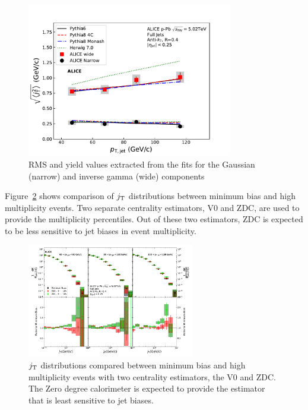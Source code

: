 \begin{figure}[htb]
\begin{center}
\includegraphics[width=0.8\textwidth]{figures/results/RMSWithSystematics_Pythia.pdf}
\caption{RMS and yield values extracted from the fits for the Gaussian (narrow) and inverse gamma (wide) components}
\label{fig:rms_models}
\end{center}
\end{figure}

Figure~\ref{fig:jt_highmult} shows comparison of $j_{\rm T}$ distributions between minimum bias and high multiplicity events. Two separate centrality estimators, V0 and ZDC, are used to provide the multiplicity percentiles. Out of these two estimators, ZDC is expected to be less sensitive to jet biases in event multiplicity.

\begin{figure}[htb]
\begin{center}
\includegraphics[width=0.65\textwidth]{figures/results/HighMJetConeJtSignalPtFrom4To8.pdf}
\caption{$j_{\rm T}$ distributions compared between minimum bias and high multiplicity events with two centrality estimators, the V0 and ZDC. The Zero degree calorimeter is expected to provide the estimator that is least sensitive to jet biases.}
\label{fig:jt_highmult}
\end{center}
\end{figure}



